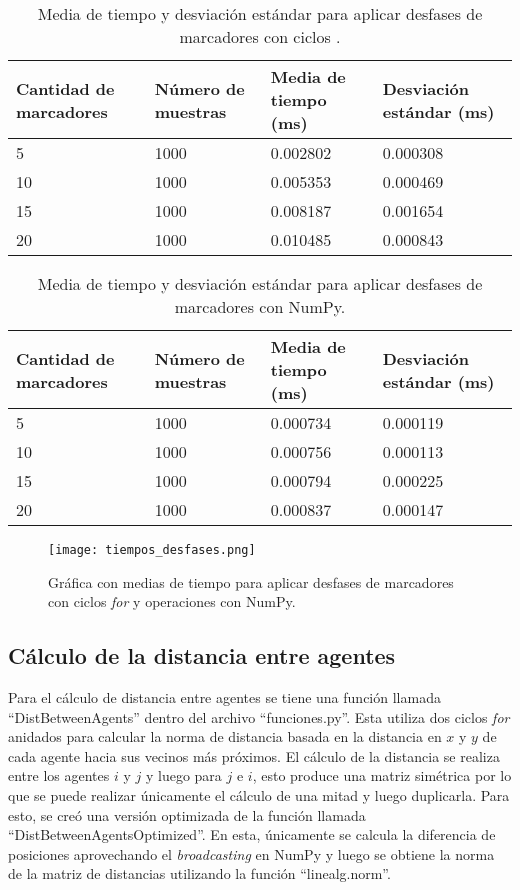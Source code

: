 \begin{table}[H]
	\centering
	\resizebox{\textwidth}{!} {
	\begin{tabular}{|l|l|l|l|}
		\hline
		\textbf{Cantidad de marcadores} & \textbf{Número de muestras} & \textbf{Media de tiempo (ms)} & \textbf{Desviación estándar (ms)} \\ \hline
		5 & 1000 & 0.002802 & 0.000308 \\ \hline
		10 & 1000 & 0.005353 & 0.000469 \\ \hline
		15 & 1000 & 0.008187 & 0.001654 \\ \hline
		20 & 1000 & 0.010485 & 0.000843 \\ \hline
	\end{tabular}}
	\caption{Media de tiempo y desviación estándar para aplicar desfases de marcadores con ciclos .}
	\label{cuadro:tiempos_desfases_for}
\end{table}

\begin{table}[H]
	\centering
	\resizebox{\textwidth}{!} {
	\begin{tabular}{|l|l|l|l|}
		\hline
		\textbf{Cantidad de marcadores} & \textbf{Número de muestras} & \textbf{Media de tiempo (ms)} & \textbf{Desviación estándar (ms)} \\ \hline
		5 & 1000 & 0.000734 & 0.000119 \\ \hline
		10 & 1000 & 0.000756 & 0.000113 \\ \hline
		15 & 1000 & 0.000794 & 0.000225 \\ \hline
		20 & 1000 & 0.000837 & 0.000147 \\ \hline
	\end{tabular}}
	\caption{Media de tiempo y desviación estándar para aplicar desfases de marcadores con NumPy.}
	\label{cuadro:tiempos_desfases_numpy}
\end{table}

\begin{figure}[H]
	\centering
	\texttt{[image: tiempos\_desfases.png]}
	\caption{Gráfica con medias de tiempo para aplicar desfases de marcadores con ciclos \textit{for} y operaciones con NumPy.}
	\label{fig:grafica_tiempos_desfases}
\end{figure}

\subsection{Cálculo de la distancia entre agentes}
Para el cálculo de distancia entre agentes se tiene una función llamada ``DistBetweenAgents'' dentro del archivo ``funciones.py''. Esta utiliza dos ciclos \textit{for} anidados para calcular la norma de distancia basada en la distancia en $x$ y $y$ de cada agente hacia sus vecinos más próximos. El cálculo de la distancia se realiza entre los agentes $i$ y $j$ y luego para $j$ e $i$, esto produce una matriz simétrica por lo que se puede realizar únicamente el cálculo de una mitad y luego duplicarla. Para esto, se creó una versión optimizada de la función llamada ``DistBetweenAgentsOptimized''. En esta, únicamente se calcula la diferencia de posiciones aprovechando el \textit{broadcasting} en NumPy y luego se obtiene la norma de la matriz de distancias utilizando la función ``linealg.norm''.

